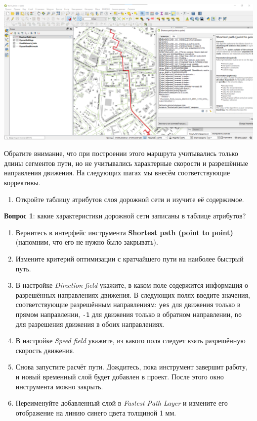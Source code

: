 \documentclass[
  12pt,
]{book}
\providecommand{\tightlist}{%
  \setlength{\itemsep}{0pt}\setlength{\parskip}{0pt}}
\begin{document}
\includegraphics{images/Ex11_RoadNetwork/shortestpath1.png}

Обратите внимание, что при построении этого маршрута учитывались только длины сегментов пути, но не учитывались характерные скорости и разрешённые направления движения. На следующих шагах мы внесём соответствующие коррективы.

\begin{enumerate}
\def\labelenumi{\arabic{enumi}.}
\setcounter{enumi}{10}
\tightlist
\item
  Откройте таблицу атрибутов слоя дорожной сети и изучите её содержимое.
\end{enumerate}

\textbf{Вопрос 1}: какие характеристики дорожной сети записаны в таблице атрибутов?

\begin{enumerate}
\def\labelenumi{\arabic{enumi}.}
\setcounter{enumi}{11}
\item
  Вернитесь в интерфейс инструмента \textbf{Shortest path (point to point)} (напомним, что его не нужно было закрывать).
\item
  Измените критерий оптимизации с кратчайшего пути на наиболее быстрый путь.
\item
  В настройке \emph{Direction field} укажите, в каком поле содержится информация о разрешённых направлениях движения. В следующих полях введите значения, соответствующие разрешённым направлениям: \texttt{yes} для движения только в прямом направлении, \texttt{-1} для движения только в обратном направлении, \texttt{no} для разрешения движения в обоих направлениях.
\item
  В настройке \emph{Speed field} укажите, из какого поля следует взять разрешённую скорость движения.
\item
  Снова запустите расчёт пути. Дождитесь, пока инструмент завершит работу, и новый временный слой будет добавлен в проект. После этого окно инструмента можно закрыть.
\item
  Переименуйте добавленный слой в \emph{Fastest Path Layer} и измените его отображение на линию синего цвета толщиной 1 мм.
\end{enumerate}
\end{document}
